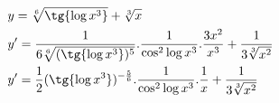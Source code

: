 \begin{ex}
\begin{align}
&y=\sqrt[6]{\tg{\log{x^3}}}+\sqrt[3]{x}\nonumber\\
&y'=\frac{1}{6\sqrt[6]{(\tg{\log{x^3}})^5}}.\frac{1}{\cos^2{\log{x^3}}}.\frac{3x^2}{x^3}+\frac{1}{3\sqrt[3]{x^2}}\nonumber\\
&y'=\frac{1}{2}(\tg{\log{x^3}})^{-\frac{5}{6}}.\frac{1}{\cos^2{\log{x^3}}}.\frac{1}{x}+\frac{1}{3\sqrt[3]{x^2}}\nonumber
\end{align}
\end{ex}